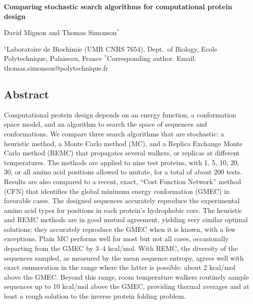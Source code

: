 \documentclass[a4paper,12pt]{article}
\begin{document}
 

\parindent 0mm

\begin{center}

\large 
{\bf Comparing stochastic search algorithms for computational protein design}
\bigskip

\normalsize
David Mignon and Thomas Simonson$^{\ast}$

\vspace{1mm}

$^{\dag}$Laboratoire de Biochimie (UMR CNRS 7654), Dept.\ of Biology, 
Ecole Polytechnique, Palaiseau, France 
$^{\ast}$Corresponding author. Email: thomas.simonson@polytechnique.fr 

\end{center}
\parindent 8mm

\subsection*{Abstract}
Computational protein design depends on an energy function, a conformation space model, and an
algorithm to search the space of sequences and conformations. We compare three search algorithms that are
stochastic: a heuristic method, a Monte Carlo method (MC), and a Replica Exchange Monte Carlo method (REMC)
that propagates several walkers, or replicas at different temperatures. The methods are applied to nine test
proteins, with 1, 5, 10, 20, 30, or all amino acid positions allowed to mutate, for a total of about 200 tests.
Results are also compared to a recent, exact, ``Cost Function Network'' method (CFN) that identifies the global
minimum energy conformation (GMEC) in favorable cases. The designed sequences accurately reproduce the experimental
amino acid types for positions in each protein's hydrophobic core. The heuristic and REMC methods are in good
mutual agreement, yielding very similar optimal solutions; they accurately reproduce the GMEC when it is known,
with a few exceptions. Plain MC performs well for most but not all cases, occasionally departing from the GMEC
by 3--4 kcal/mol. With REMC, the diversity of the sequences sampled, as measured by the mean sequence entropy,
agrees well with exact enumeration in the range where the latter is possible: about 2 kcal/mol above the GMEC.
Beyond this range, room temperature walkers routinely sample sequences up to 10 kcal/mol above the GMEC, providing
thermal averages and at least a rough solution to the inverse protein folding problem.
\end{document}
